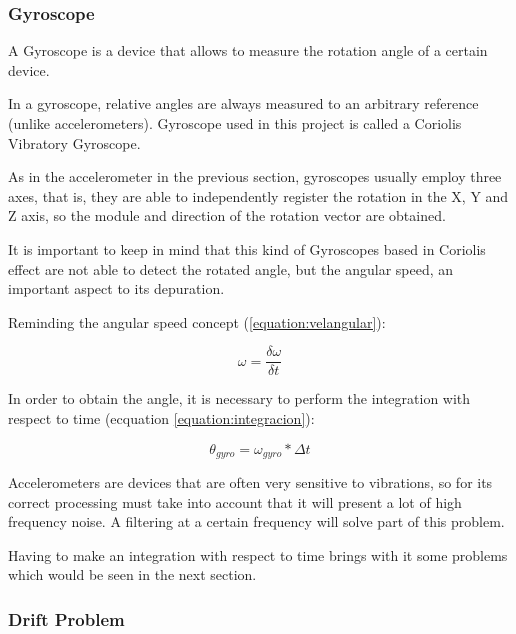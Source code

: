 \subsubsection{Gyroscope}
A Gyroscope is a device that allows to measure the rotation angle of a certain device. \newline

In a gyroscope, relative angles are always measured to an arbitrary reference (unlike accelerometers). Gyroscope used in this project is called a Coriolis Vibratory Gyroscope. \newline

As in the accelerometer in the previous section, gyroscopes usually employ three axes, that is, they are able to independently register the rotation in the X, Y and Z axis, so the module and direction of the rotation vector are obtained.\newline

It is important to keep in mind that this kind of Gyroscopes based in Coriolis effect are not able to detect the rotated angle, but the angular speed, an important aspect to its depuration. \newline

Reminding the angular speed concept (\ref{equation:velangular}):

\begin{equation} \label{equation:velangular}
\omega = \frac{\delta \omega}{\delta t}
\end{equation}

In order to obtain the angle, it is necessary to perform the integration with respect to time (ecquation \ref{equation:integracion}):

\begin{equation}\label{equation:integracion}
\theta_{gyro} = \omega_{gyro}*\Delta t
\end{equation}

Accelerometers are devices that are often very sensitive to vibrations, so for its correct processing must take into account that it will present a lot of high frequency noise. A filtering at a certain frequency will solve part of this problem.\newline

Having to make an integration with respect to time brings with it some problems which would be seen in the next section.

\subsubsection{Drift Problem}

